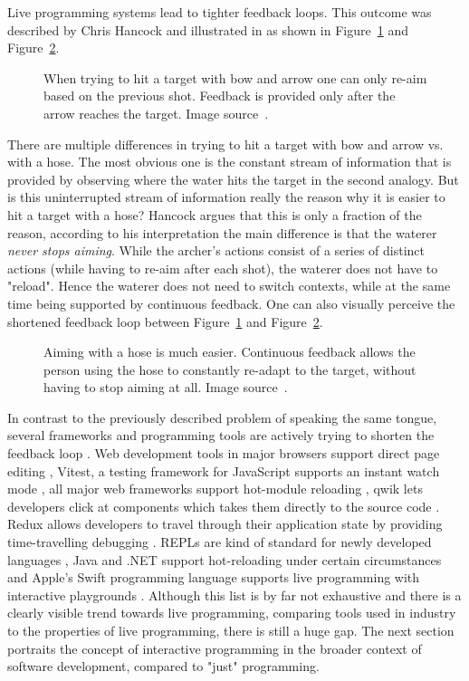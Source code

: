 Live programming systems lead to tighter feedback loops.
This outcome was described by Chris Hancock \cite{hancock_real-time_2003} and illustrated in \cite{aguiar_live_2019} as shown in Figure~\ref{fig:bow-arrow} and Figure~\ref{fig:waterhose}.
%
\begin{figure}[h]
\centering

\caption{When trying to hit a target with bow and arrow one can only re-aim based on the previous shot. Feedback is provided only after the arrow reaches the target. Image source~\cite{aguiar_live_2019}.}
\label{fig:bow-arrow}
\end{figure}
%
There are multiple differences in trying to hit a target with bow and arrow vs. with a hose.
The most obvious one is the constant stream of information that is provided by observing where the water hits the target in the second analogy.
But is this uninterrupted stream of information really the reason why it is easier to hit a target with a hose?
Hancock \cite{hancock_real-time_2003} argues that this is only a fraction of the reason, according to his interpretation the main difference is that the waterer \emph{never stops aiming}.
While the archer's actions consist of a series of distinct actions (while having to re-aim after each shot), the waterer does not have to "reload".
Hence the waterer does not need to switch contexts, while at the same time being supported by continuous feedback.
One can also visually perceive the shortened feedback loop between Figure~\ref{fig:bow-arrow} and Figure~\ref{fig:waterhose}.

\begin{figure}[h]
\centering

\caption{Aiming with a hose is much easier. Continuous feedback allows the person using the hose to constantly re-adapt to the target, without having to stop aiming at all. Image source~\cite{aguiar_live_2019}.}
\label{fig:waterhose}
\end{figure}

In contrast to the previously described problem of speaking the same tongue, several frameworks and programming tools are actively trying to shorten the feedback loop \cite{kubelka_road_2018}.
Web development tools in major browsers support direct page editing \addref, Vitest, a testing framework for JavaScript supports an instant watch mode \addref, all major web frameworks support hot-module reloading \addref, qwik lets developers click at components which takes them directly to the source code \addref. Redux allows developers to travel through their application state by providing time-travelling debugging \addref.
REPLs are kind of standard for newly developed languages \addref, Java and .NET support hot-reloading under certain circumstances \addref and Apple's Swift programming language supports live programming with interactive playgrounds \addref.
Although this list is by far not exhaustive and there is a clearly visible trend towards live programming, comparing tools used in industry to the properties of live programming, there is still a huge gap.
The next section portraits the concept of interactive programming in the broader context of software development, compared to "just" programming.



